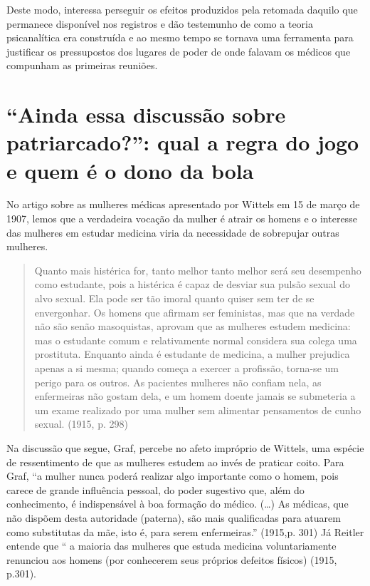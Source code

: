 Deste modo, interessa perseguir os efeitos produzidos pela retomada
daquilo que permanece disponível nos registros e dão testemunho de como
a teoria psicanalítica era construída e ao mesmo tempo se tornava uma
ferramenta para justificar os pressupostos dos lugares de poder de onde
falavam os médicos que compunham as primeiras reuniões.

\section{``Ainda essa discussão sobre patriarcado?'': qual a regra do jogo
e quem é o dono da bola}

No artigo sobre as mulheres médicas apresentado por Wittels em 15 de
março de 1907, lemos que a verdadeira vocação da mulher é atrair os
homens e o interesse das mulheres em estudar medicina viria da
necessidade de sobrepujar outras mulheres.

\begin{quote}
Quanto mais histérica for, tanto melhor tanto melhor será seu desempenho
como estudante, pois a histérica é capaz de desviar sua pulsão sexual do
alvo sexual. Ela pode ser tão imoral quanto quiser sem ter de se
envergonhar. Os homens que afirmam ser feministas, mas que na verdade
não são senão masoquistas, aprovam que as mulheres estudem medicina: mas
o estudante comum e relativamente normal considera sua colega uma
prostituta. Enquanto ainda é estudante de medicina, a mulher prejudica
apenas a si mesma; quando começa a exercer a profissão, torna-se um
perigo para os outros. As pacientes mulheres não confiam nela, as
enfermeiras não gostam dela, e um homem doente jamais se submeteria a um
exame realizado por uma mulher sem alimentar pensamentos de cunho
sexual. (1915, p. 298)
\end{quote}

Na discussão que segue, Graf, percebe no afeto impróprio de Wittels, uma
espécie de ressentimento de que as mulheres estudem ao invés de praticar
coito. Para Graf, ``a mulher nunca poderá realizar algo importante como
o homem, pois carece de grande influência pessoal, do poder sugestivo
que, além do conhecimento, é indispensável à boa formação do médico.
(\ldots{}) As médicas, que não dispõem desta autoridade (paterna), são mais
qualificadas para atuarem como substitutas da mãe, isto é, para serem
enfermeiras.'' (1915,p. 301) Já Reitler entende que `` a maioria das
mulheres que estuda medicina voluntariamente renunciou aos homens (por
conhecerem seus próprios defeitos físicos) (1915, p.301).

